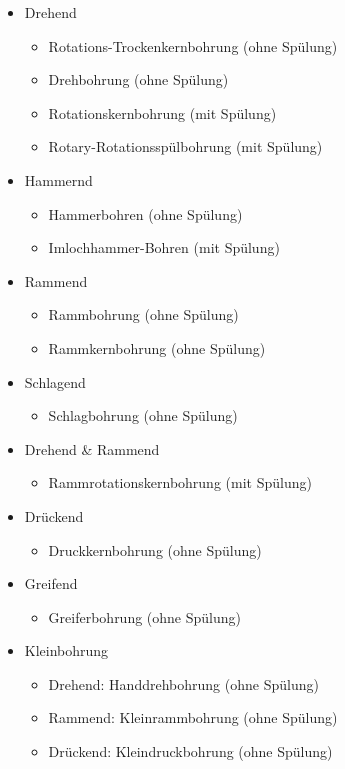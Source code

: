 \documentclass[12pt,a4paper,draft]{scrartcl} %
\begin{document}
\begin{itemize}

\item Drehend
	\begin{itemize}
	\item Rotations-Trockenkernbohrung (ohne Spülung)
	\item Drehbohrung (ohne Spülung)
	\item Rotationskernbohrung (mit Spülung)
	\item Rotary-Rotationsspülbohrung (mit Spülung)
	\end{itemize}
	
\item Hammernd
\begin{itemize}
	\item Hammerbohren (ohne Spülung)
	\item Imlochhammer-Bohren (mit Spülung)
\end{itemize}

\item Rammend
	\begin{itemize}
	\item Rammbohrung (ohne Spülung)
	\item Rammkernbohrung (ohne Spülung)
	\end{itemize}

\item Schlagend
	\begin{itemize}
	\item Schlagbohrung (ohne Spülung)
	\end{itemize}

\item Drehend \& Rammend
	\begin{itemize}
	\item Rammrotationskernbohrung (mit Spülung)
	\end{itemize}

\item Drückend
	\begin{itemize}
	\item Druckkernbohrung (ohne Spülung)
	\end{itemize}
	
\item Greifend
	\begin{itemize}
	\item Greiferbohrung (ohne Spülung)
	\end{itemize}

\item Kleinbohrung
	\begin{itemize}
	\item Drehend: Handdrehbohrung (ohne Spülung)
	\item Rammend: Kleinrammbohrung (ohne Spülung)
	\item Drückend: Kleindruckbohrung (ohne Spülung)
	\end{itemize}

\end{itemize}
\end{document}
